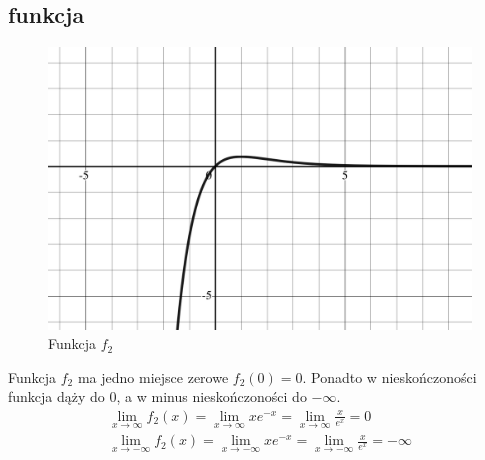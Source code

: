 \documentclass{article}
\begin{document}
\subsection*{funkcja }
\begin{figure}[H]
  \centering
  \includegraphics[width=\textwidth]{./ex6f2.png}
  \caption{Funkcja $f_2$}
\end{figure}
Funkcja $f_2$ ma jedno miejsce zerowe $f_2(0) = 0$. Ponadto w nieskończoności
funkcja dąży do $0$, a w minus nieskończoności do $-\infty$.
\begin{gather*}
  \lim_{x \to \infty} f_2(x) = \lim_{x \to \infty} xe^{-x} = \lim_{x \to \infty} \frac{x}{e^x} = 0\\
  \lim_{x \to -\infty} f_2(x) = \lim_{x \to -\infty} xe^{-x} = \lim_{x \to -\infty} \frac{x}{e^x} = -\infty
\end{gather*}
\end{document}
